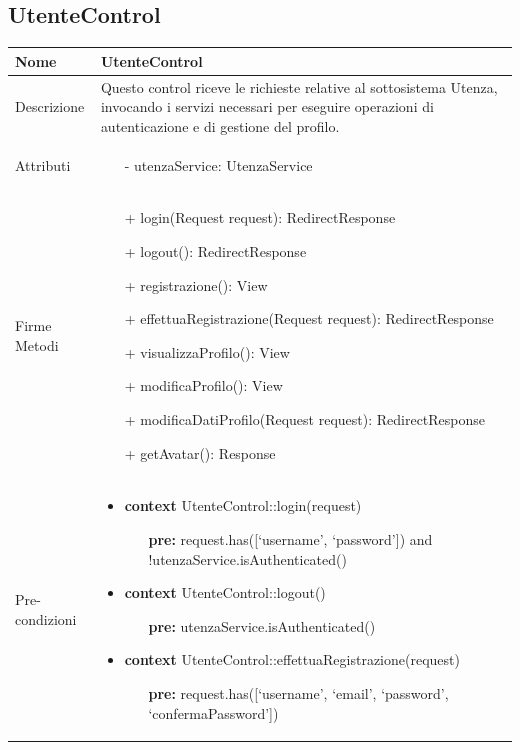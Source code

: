 \subsection{UtenteControl}
\small\begin{tabular}{|| l | p{28em} ||} 
	\hline
	Nome & UtenteControl\\
	\hline
	Descrizione & Questo control riceve le richieste relative al sottosistema Utenza, invocando i servizi necessari per eseguire operazioni di autenticazione e di gestione del profilo. \\
	\hline
	Attributi & \begin{itemize}
		\item[-] utenzaService: UtenzaService
	\end{itemize}\\
	\hline
	Firme Metodi & \begin{itemize}
		\item[+] login(Request request): RedirectResponse
		\item[+] logout(): RedirectResponse
		\item[+] registrazione(): View
		\item[+] effettuaRegistrazione(Request request): RedirectResponse 
		\item[+] visualizzaProfilo(): View
		\item[+] modificaProfilo(): View
		\item[+] modificaDatiProfilo(Request request): RedirectResponse
		\item[+] getAvatar(): Response 
	\end{itemize}\\
	\hline
	Pre-condizioni & \begin{itemize}
		\item \textbf{context} UtenteControl::login(request)
		\begin{itemize}
			\item[ ] \textbf{pre:} request.has([‘username’, ‘password’]) and !utenzaService.isAuthenticated()
		\end{itemize}
	  
	    \item \textbf{context} UtenteControl::logout()
		\begin{itemize}
			\item[ ] \textbf{pre:} utenzaService.isAuthenticated()
		\end{itemize} 
	  
	    \item \textbf{context} UtenteControl::effettuaRegistrazione(request) 
		\begin{itemize}
			\item[ ] \textbf{pre:} request.has([‘username’, ‘email’, ‘password’, ‘confermaPassword’])
		\end{itemize} 
	  

\end{itemize}
\end{tabular}
